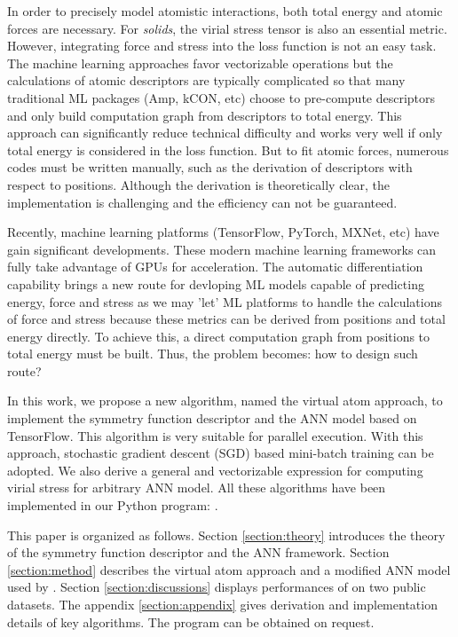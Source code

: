 \documentclass[preprint]{revtex4-2}
\begin{document}
In order to precisely model atomistic interactions, both total energy and atomic 
forces are necessary. For \textit{solids}, the virial stress tensor is also an
essential metric. However, integrating force and stress into the loss function 
is not an easy task. The machine learning approaches favor vectorizable 
operations but the calculations of atomic descriptors are typically complicated 
so that many traditional ML packages (Amp, kCON, etc) choose to pre-compute 
descriptors and only build computation graph from descriptors to total energy. 
This approach can significantly reduce technical difficulty and works very well 
if only total energy is considered in the loss function. But to fit atomic 
forces, numerous codes must be written manually, such as the derivation of 
descriptors with respect to positions. Although the derivation is theoretically
clear, the implementation is challenging and the efficiency can not be 
guaranteed.

Recently, machine learning platforms (TensorFlow\cite{tensorflow}, 
PyTorch\cite{pytorch}, MXNet\cite{MXNet}, etc) have gain significant 
developments. These modern machine learning frameworks can fully take advantage 
of GPUs for acceleration. The automatic differentiation capability brings a new 
route for devloping ML models capable of predicting energy, force and stress as 
we may 'let' ML platforms to handle the calculations of force and stress because 
these metrics can be derived from positions and total energy directly. To 
achieve this, a direct computation graph from positions to total energy must be
built. Thus, the problem becomes: how to design such route?

In this work, we propose a new algorithm, named the virtual atom approach, to 
implement the symmetry function descriptor and the ANN model based on 
TensorFlow. This algorithm is very suitable for parallel execution. With this 
approach, stochastic gradient descent (SGD) based mini-batch training can be 
adopted. We also derive a general and vectorizable expression for computing 
virial stress for arbitrary ANN model. All these algorithms have been 
implemented in our Python program: \tensoralloy{}. 

This paper is organized as follows. Section \ref{section:theory} introduces the 
theory of the symmetry function descriptor and the ANN framework. Section 
\ref{section:method} describes the virtual atom approach and a modified ANN 
model used by \tensoralloy{}. Section \ref{section:discussions} displays 
performances of \tensoralloy{} on two public datasets. The appendix 
\ref{section:appendix} gives derivation and implementation details of key 
algorithms. The \tensoralloy{} program can be obtained on request.
\end{document}
